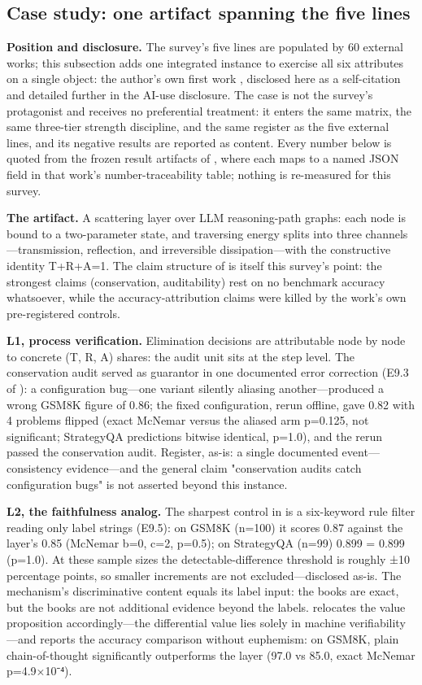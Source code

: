 \documentclass[11pt,a4paper]{article}
\begin{document}
\subsection{Case study: one artifact spanning the five lines}

\textbf{Position and disclosure.} The survey's five lines are populated by 60 external works; this subsection adds one integrated instance to exercise all six attributes on a single object: the author's own first work \cite{key04}, disclosed here as a self-citation and detailed further in the AI-use disclosure. The case is not the survey's protagonist and receives no preferential treatment: it enters the same matrix, the same three-tier strength discipline, and the same register as the five external lines, and its negative results are reported as content. Every number below is quoted from the frozen result artifacts of \cite{key04}, where each maps to a named JSON field in that work's number-traceability table; nothing is re-measured for this survey.

\textbf{The artifact.} A scattering layer over LLM reasoning-path graphs: each node is bound to a two-parameter state, and traversing energy splits into three channels—transmission, reflection, and irreversible dissipation—with the constructive identity T+R+A=1. The claim structure of \cite{key04} is itself this survey's point: the strongest claims (conservation, auditability) rest on no benchmark accuracy whatsoever, while the accuracy-attribution claims were killed by the work's own pre-registered controls.

\textbf{L1, process verification.} Elimination decisions are attributable node by node to concrete (T, R, A) shares: the audit unit sits at the step level. The conservation audit served as guarantor in one documented error correction (E9.3 of \cite{key04}): a configuration bug—one variant silently aliasing another—produced a wrong GSM8K figure of 0.86; the fixed configuration, rerun offline, gave 0.82 with 4 problems flipped (exact McNemar versus the aliased arm p=0.125, not significant; StrategyQA predictions bitwise identical, p=1.0), and the rerun passed the conservation audit. Register, as-is: a single documented event—consistency evidence—and the general claim "conservation audits catch configuration bugs" is not asserted beyond this instance.

\textbf{L2, the faithfulness analog.} The sharpest control in \cite{key04} is a six-keyword rule filter reading only label strings (E9.5): on GSM8K (n=100) it scores 0.87 against the layer's 0.85 (McNemar b=0, c=2, p=0.5); on StrategyQA (n=99) 0.899 = 0.899 (p=1.0). At these sample sizes the detectable-difference threshold is roughly ±10 percentage points, so smaller increments are not excluded—disclosed as-is. The mechanism's discriminative content equals its label input: the books are exact, but the books are not additional evidence beyond the labels. \cite{key04} relocates the value proposition accordingly—the differential value lies solely in machine verifiability—and reports the accuracy comparison without euphemism: on GSM8K, plain chain-of-thought significantly outperforms the layer (97.0 vs 85.0, exact McNemar p=4.9×10⁻⁴).
\end{document}
